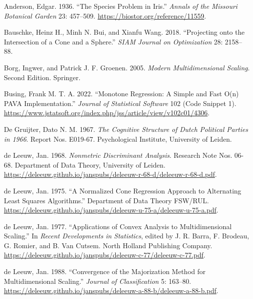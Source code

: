 \documentclass[
  12pt,
  letterpaper,
  DIV=11,
  numbers=noendperiod]{scrartcl}
\newlength{\cslhangindent}
\newenvironment{CSLReferences}[2] %
 {\begin{list}{}{%
  \setlength{\itemindent}{0pt}
  \setlength{\leftmargin}{0pt}
  \setlength{\parsep}{0pt}
  \ifodd #1
   \setlength{\leftmargin}{\cslhangindent}
   \setlength{\itemindent}{-1\cslhangindent}
  \fi
  \setlength{\itemsep}{#2\baselineskip}}}
 {\end{list}}
\begin{document}
\protect{}\label{refs}
\begin{CSLReferences}{1}{1}
Anderson, Edgar. 1936. {``The Species Problem in Iris.''} \emph{Annals
of the Missouri Botanical Garden} 23: 457--509.
\url{https://biostor.org/reference/11559}.

Bauschke, Heinz H., Minh N. Bui, and Xianfu Wang. 2018. {``{Projecting
onto the Intersection of a Cone and a Sphere}.''} \emph{SIAM Journal on
Optimization} 28: 2158--88.

Borg, Ingwer, and Patrick J. F. Groenen. 2005. \emph{Modern
Multidimensional Scaling}. Second Edition. Springer.

Busing, Frank M. T. A. 2022. {``{Monotone Regression: A Simple and Fast
O(n) PAVA Implementation.}''} \emph{Journal of Statistical Software} 102
(Code Snippet 1).
\url{https://www.jstatsoft.org/index.php/jss/article/view/v102c01/4306}.

De Gruijter, Dato N. M. 1967. \emph{{The Cognitive Structure of Dutch
Political Parties in 1966}}. Report Nos. E019-67. Psychological
Institute, University of Leiden.

{de Leeuw, Jan}. 1968. \emph{{Nonmetric Discriminant Analysis}}.
Research Note Nos. 06-68. Department of Data Theory, University of
Leiden.
\url{https://deleeuw.github.io/janspubs/deleeuw-r-68-d/deleeuw-r-68-d.pdf}.

{de Leeuw, Jan}. 1975. {``{A Normalized Cone Regression Approach to
Alternating Least Squares Algorithms}.''} Department of Data Theory
FSW/RUL.
\url{https://deleeuw.github.io/janspubs/deleeuw-u-75-a/deleeuw-u-75-a.pdf}.

{de Leeuw, Jan}. 1977. {``{Applications of Convex Analysis to
Multidimensional Scaling}.''} In \emph{Recent Developments in
Statistics}, edited by J. R. Barra, F. Brodeau, G. Romier, and B. Van
Cutsem. North Holland Publishing Company.
\url{https://deleeuw.github.io/janspubs/deleeuw-c-77/deleeuw-c-77.pdf}.

{de Leeuw, Jan}. 1988. {``{Convergence of the Majorization Method for
Multidimensional Scaling}.''} \emph{Journal of Classification} 5:
163--80.
\url{https://deleeuw.github.io/janspubs/deleeuw-a-88-b/deleeuw-a-88-b.pdf}.


\end{CSLReferences}
\end{document}
